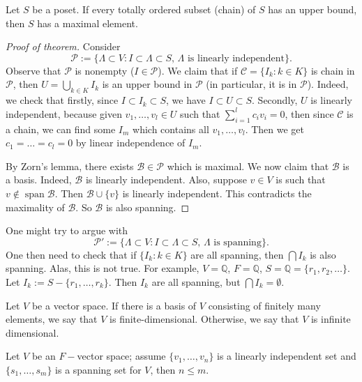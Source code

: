 \documentclass{scrartcl}
\def\le{\leqslant}
\def\Q{\mathbb{Q}}
\DeclareMathOperator{\spn}{span}  %
\begin{document}
\begin{lemma}
	Let $S$ be a poset. If every totally ordered subset (chain) of $S$ has an upper bound, then $S$ has a maximal element. 
\end{lemma}
\begin{proof}[Proof of theorem]
	Consider 
	\[\mathcal{P} := \{\Lambda \subset V: I \subset \Lambda \subset S,\, \text{$\Lambda$ is linearly independent}\}.\]
	Observe that $\mathcal{P}$ is nonempty ($I \in \mathcal{P}$). We claim that if $\mathcal{C} = \{I_k: k \in K\}$ is chain in $\mathcal{P}$, then $U = \bigcup_{k \in K}I_k$ is an upper bound in $\mathcal{P}$ (in particular, it is in $\mathcal{P}$). Indeed, we check that firstly, since $I \subset I_k \subset S$, we have $I \subset U \subset S$. Secondly, $U$ is linearly independent, because given $v_1, \dots, v_l \in U$ such that $\sum_{i=1}^l c_iv_i = 0$, then since $\mathcal{C}$ is a chain, we can find some $I_m$ which contains all $v_1, \dots, v_l$. Then we get $c_1=\dots=c_l=0$ by linear independence of $I_m$.
	\par By Zorn's lemma, there exists $\mathcal{B} \in \mathcal{P}$ which is maximal. We now claim that $\mathcal{B}$ is a basis. Indeed, $\mathcal{B}$ is linearly independent. Also, suppose $v \in V$ is such that $v \notin \spn{\mathcal{B}}$. Then $\mathcal{B} \cup \{v\}$ is linearly independent. This contradicts the maximality of $\mathcal{B}$. So $\mathcal{B}$ is also spanning.
\end{proof}
\begin{remark}
	One might try to argue with
	\[\mathcal{P}' := \{\Lambda \subset V: I \subset \Lambda \subset S,\,\text{$\Lambda$ is spanning}\}.\]
	One then need to check that if $\{I_k: k\in K\}$ are all spanning, then $\bigcap I_k$ is also spanning. Alas, this is not true. For example, $V=\Q$, $F=\Q$, $S = \Q = \{r_1, r_2, \dots\}$. Let $I_k := S - \{r_1, \dots, r_k\}$. Then $I_k$ are all spanning, but $\bigcap I_k = \emptyset$.
\end{remark}
\begin{definition}
	Let $V$ be a vector space. If there is a basis of $V$ consisting of finitely many elements, we say that $V$ is finite-dimensional. Otherwise, we say that $V$ is infinite dimensional.
\end{definition}
\begin{theorem}
	Let $V$ be an $F-$vector space; assume $\{v_1, \dots, v_n\}$ is a linearly independent set and $\{s_1, \dots, s_m\}$ is a spanning set for $V$, then $n \le m$.
\end{theorem}
\end{document}
